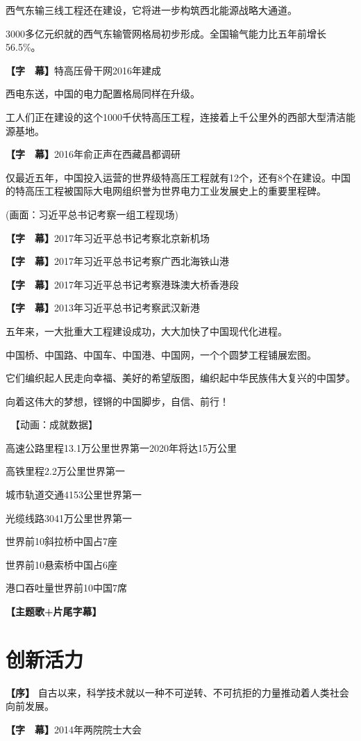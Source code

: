 \documentclass{ctexart}
\newcommand{\zkh}[1]{\textbf{\hspace{-2.7em} 【#1】}}
\begin{document}
 西气东输三线工程还在建设，它将进一步构筑西北能源战略大通道。

3000多亿元织就的西气东输管网格局初步形成。全国输气能力比五年前增长56.5{\%}。

 \zkh{字　幕}特高压骨干网2016年建成

 西电东送，中国的电力配置格局同样在升级。

工人们正在建设的这个1000千伏特高压工程，连接着上千公里外的西部大型清洁能源基地。

 \zkh{字　幕}2016年俞正声在西藏昌都调研

 
仅最近五年，中国投入运营的世界级特高压工程就有12个，还有8个在建设。中国的特高压工程被国际大电网组织誉为世界电力工业发展史上的重要里程碑。

 (画面：习近平总书记考察一组工程现场)

 \zkh{字　幕}2017年习近平总书记考察北京新机场

 \zkh{字　幕}2017年习近平总书记考察广西北海铁山港

 \zkh{字　幕}2017年习近平总书记考察港珠澳大桥香港段

 \zkh{字　幕}2013年习近平总书记考察武汉新港

 五年来，一大批重大工程建设成功，大大加快了中国现代化进程。

 中国桥、中国路、中国车、中国港、中国网，一个个圆梦工程铺展宏图。

 它们编织起人民走向幸福、美好的希望版图，编织起中华民族伟大复兴的中国梦。

 向着这伟大的梦想，铿锵的中国脚步，自信、前行！

 　【动画：成就数据】 
 
 高速公路里程13.1万公里世界第一2020年将达15万公里

 高铁里程2.2万公里世界第一

 城市轨道交通4153公里世界第一

 光缆线路3041万公里世界第一

 世界前10斜拉桥中国占7座

 世界前10悬索桥中国占6座

港口吞吐量世界前10中国7席

\zkh{主题歌+片尾字幕}

\newpage\part{创新活力}

\zkh{序} 自古以来，科学技术就以一种不可逆转、不可抗拒的力量推动着人类社会向前发展。

 \zkh{字　幕}2014年两院院士大会
\end{document}
